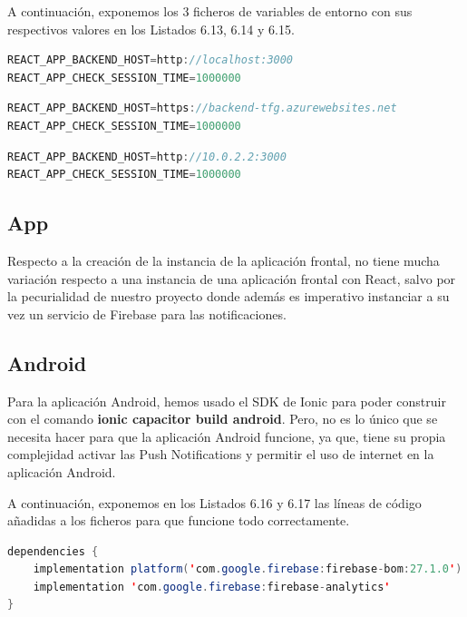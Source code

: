 A continuación, exponemos los 3 ficheros de variables de entorno con sus respectivos valores en los Listados 6.13, 6.14 y 6.15.

\begin{lstlisting}[language=Java,caption={Fichero .env},captionpos=b]
REACT_APP_BACKEND_HOST=http://localhost:3000
REACT_APP_CHECK_SESSION_TIME=1000000
\end{lstlisting}

\begin{lstlisting}[language=Java,caption={Fichero .env.production},captionpos=b]
REACT_APP_BACKEND_HOST=https://backend-tfg.azurewebsites.net
REACT_APP_CHECK_SESSION_TIME=1000000
\end{lstlisting}

\begin{lstlisting}[language=Java,caption={Fichero .env.android},captionpos=b]
REACT_APP_BACKEND_HOST=http://10.0.2.2:3000
REACT_APP_CHECK_SESSION_TIME=1000000
\end{lstlisting}

\subsection{App}
Respecto a la creación de la instancia de la aplicación frontal, no tiene mucha variación respecto a una instancia de una aplicación frontal con React, salvo por la pecurialidad de nuestro proyecto donde además es imperativo instanciar a su vez un servicio de Firebase para las notificaciones.

\subsection{Android}
Para la aplicación Android, hemos usado el SDK de Ionic para poder construir con el comando \textbf{ionic capacitor build android}.
Pero, no es lo único que se necesita hacer para que la aplicación Android funcione, ya que, tiene su propia complejidad activar las Push Notifications y permitir el uso de internet en la aplicación Android.

A continuación, exponemos en los Listados 6.16 y 6.17 las líneas de código añadidas a los ficheros para que funcione todo correctamente.

\begin{lstlisting}[language=Java,caption={Fichero app/build.gradle},captionpos=b]
dependencies {
    implementation platform('com.google.firebase:firebase-bom:27.1.0')
    implementation 'com.google.firebase:firebase-analytics'
}
\end{lstlisting}


